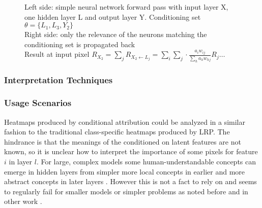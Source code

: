 \begin{figure}[htbp]

    \caption{Left side: simple neural network forward pass with input layer X, one hidden layer L and output layer Y. Conditioning set $\theta = \{L_1, L_3, Y_2\}$ \\ Right side: only the relevance of the neurons matching the conditioning set is propagated back \\
        Result at input pixel $R_{X_2} = \sum_{j}  R_{X_2 \gets L_j} =  \sum_i \sum_{j} \cdot \frac{a_i w_{ij}}{\sum_h a_h w_{hj}} R_j \dots$ }
    \label{fig:crp_example_condition}
\end{figure}

\subsubsection{Interpretation Techniques}

\subsubsection*{Usage Scenarios}
Heatmaps produced by conditional attribution could be analyzed in a similar fashion to the traditional class-specific heatmaps produced by LRP. The hindrance is that the meanings of the conditioned on latent features are not known, so it is unclear how to interpret the importance of some pixels for feature $i$ in layer $l$. For large, complex models some human-understandable concepts can emerge in hidden layers from simpler more local concepts in earlier and more abstract concepts in later layers \cite{Bau2017, Hohman2020, Olah2017, Bau2020}. However this is not a fact to rely on and seems to regularly fail for smaller models or simpler problems as noted before and in other work .

